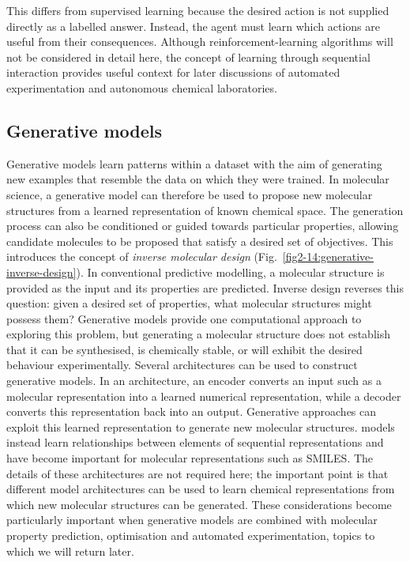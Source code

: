 This differs from supervised learning because the desired action is not supplied directly as a labelled answer.
Instead, the agent must learn which actions are useful from their consequences.
Although reinforcement-learning algorithms will not be considered in detail here, the concept of learning through sequential interaction provides useful context for later discussions of automated experimentation and autonomous chemical laboratories.

\subsection{Generative models} 

Generative models learn patterns within a dataset with the aim of generating new examples that resemble the data on which they were trained. 
In molecular science, a generative model can therefore be used to propose new molecular structures from a learned representation of known chemical space. 
The generation process can also be conditioned or guided towards particular properties, allowing candidate molecules to be proposed that satisfy a desired set of objectives. 
This introduces the concept of \textit{inverse molecular design} (Fig.~\ref{fig2-14:generative-inverse-design}).
In conventional predictive modelling, a molecular structure is provided as the input and its properties are predicted.
Inverse design reverses this question: given a desired set of properties, what molecular structures might possess them? 
Generative models provide one computational approach to exploring this problem, but generating a molecular structure does not establish that it can be synthesised, is chemically stable, or will exhibit the desired behaviour experimentally. 
Several architectures can be used to construct generative models.
In an  architecture, an encoder converts an input such as a molecular representation into a learned numerical representation, while a decoder converts this representation back into an output.
Generative approaches can exploit this learned representation to generate new molecular structures.
 models instead learn relationships between elements of sequential representations and have become important for molecular representations such as SMILES.
The details of these architectures are not required here; the important point is that different model architectures can be used to learn chemical representations from which new molecular structures can be generated.
These considerations become particularly important when generative models are combined with molecular property prediction, optimisation and automated experimentation, topics to which we will return later.

